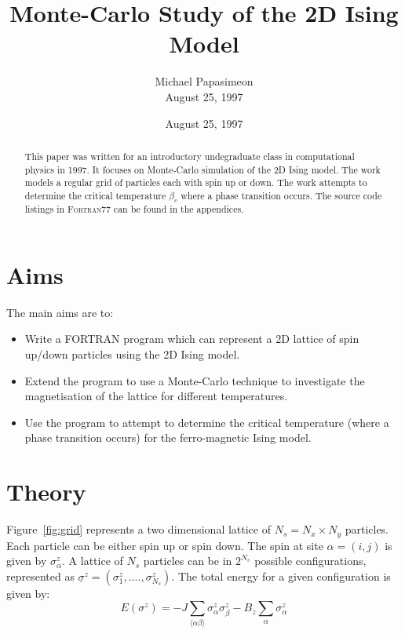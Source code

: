 \documentclass[a4paper]{IEEEtran}
\title{Monte-Carlo Study of the 2D Ising Model}
\author{Michael Papasimeon\\ August 25, 1997}
\date{August 25, 1997}
\newcommand{\sz}{\underline{\sigma}^z}
\begin{document}
\maketitle


\begin{abstract}
This paper was written for an introductory undegraduate class in computational
physics in 1997. It focuses on Monte-Carlo simulation of the 2D Ising model.
The work models a regular grid of particles each with spin up or down. The work
attempts to determine the critical temperature $\beta_c$ where a phase
transition occurs. 
The source code listings in \textsc{Fortran77} can be found in the appendices.
\end{abstract}

\section{Aims}
The main aims are to:
\begin{itemize}
    \item Write a FORTRAN program which can represent 
          a 2D lattice of spin up/down particles using the 2D Ising model.
    \item Extend the program to use a Monte-Carlo technique to investigate
          the magnetisation of the lattice for different temperatures.
    \item Use the program to attempt to determine the critical temperature
          (where a phase transition occurs) for the ferro-magnetic Ising 
          model.
\end{itemize}


\section{Theory}
    Figure~\ref{fig:grid} represents a two dimensional lattice of 
    $N_s = N_x \times N_y$ particles. Each particle can be either 
    spin up or spin down. The spin at site $\alpha = (i,j)$
    is given by $\sigma^{z}_{\alpha}$. 
    A lattice of $N_s$ particles can be in $2^{N_s}$ possible configurations,
    represented as $\sz = ( \sigma^z_1,...., \sigma^z_{N_s} )$.
    The total energy for a given configuration is given by:
    \[ E(\sigma^z) = -J \sum_{\langle \alpha \beta \rangle} 
                        \sigma_{\alpha}^{z} \sigma_{\beta}^{z}
                   -B_z \sum_{\alpha } \sigma_{\alpha}^{z} \]
\end{document}
